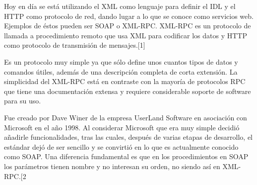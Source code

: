 Hoy en día se está utilizando el XML como lenguaje para definir el IDL y el HTTP
como protocolo de red, dando lugar a lo que se conoce como servicios web.
Ejemplos de éstos pueden ser SOAP o XML-RPC. XML-RPC es un protocolo de llamada a
procedimiento remoto que usa XML para codificar los datos y HTTP como protocolo
de transmisión de mensajes.[1]

Es un protocolo muy simple ya que sólo define unos cuantos tipos de datos y
comandos útiles, además de una descripción completa de corta extensión. La
simplicidad del XML-RPC está en contraste con la mayoría de protocolos RPC que
tiene una documentación extensa y requiere considerable soporte de software para
su uso.

Fue creado por Dave Winer de la empresa UserLand Software en asociación con
Microsoft en el año 1998. Al considerar Microsoft que era muy simple decidió
añadirle funcionalidades, tras las cuales, después de varias etapas de
desarrollo, el estándar dejó de ser sencillo y se convirtió en lo que es
actualmente conocido como SOAP. Una diferencia fundamental es que en los
procedimientos en SOAP los parámetros tienen nombre y no interesan su orden, no
siendo así en XML-RPC.[2
